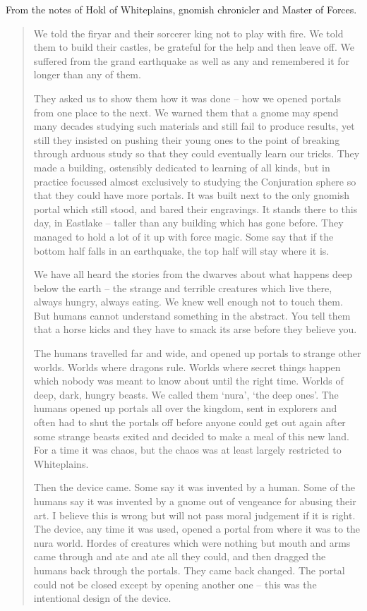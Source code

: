 \begin{multicols}{2}
\label{r_hunter}

From the notes of Hokl of Whiteplains, gnomish chronicler and Master of Forces.

\begin{quotation}

  We told the firyar and their sorcerer king not to play with fire.
  We told them to build their castles, be grateful for the help and then leave off.
  We suffered from the grand earthquake as well as any and remembered it for longer than any of them.  

  They asked us to show them how it was done -- how we opened portals from one place to the next.
  We warned them that a gnome may spend many decades studying such materials and still fail to produce results, yet still they insisted on pushing their young ones to the point of breaking through arduous study so that they could eventually learn our tricks.
  They made a building, ostensibly dedicated to learning of all kinds, but in practice focussed almost exclusively to studying the Conjuration sphere so that they could have more portals.
  It was built next to the only gnomish portal which still stood, and bared their engravings.
  It stands there to this day, in Eastlake -- taller than any building which has gone before.
  They managed to hold a lot of it up with force magic.
  Some say that if the bottom half falls in an earthquake, the top half will stay where it is.

  We have all heard the stories from the dwarves about what happens deep below the earth -- the strange and terrible creatures which live there, always hungry, always eating.
  We knew well enough not to touch them.
  But humans cannot understand something in the abstract.
  You tell them that a horse kicks and they have to smack its arse before they believe you.

  The humans travelled far and wide, and opened up portals to strange other worlds.
  Worlds where dragons rule.
  Worlds where secret things happen which nobody was meant to know about until the right time.
  Worlds of deep, dark, hungry beasts.
  We called them `nura', `the deep ones'.
  The humans opened up portals all over the kingdom, sent in explorers and often had to shut the portals off before anyone could get out again after some strange beasts exited and decided to make a meal of this new land.
  For a time it was chaos, but the chaos was at least largely restricted to Whiteplains.

  Then the device came.
  Some say it was invented by a human.
  Some of the humans say it was invented by a gnome out of vengeance for abusing their art.
  I believe this is wrong but will not pass moral judgement if it is right.
  The device, any time it was used, opened a portal from where it was to the nura world.
  Hordes of creatures which were nothing but mouth and arms came through and ate and ate all they could, and then dragged the humans back through the portals.
  They came back changed.
  The portal could not be closed except by opening another one -- this was the intentional design of the device.


\end{quotation}
\end{multicols}

